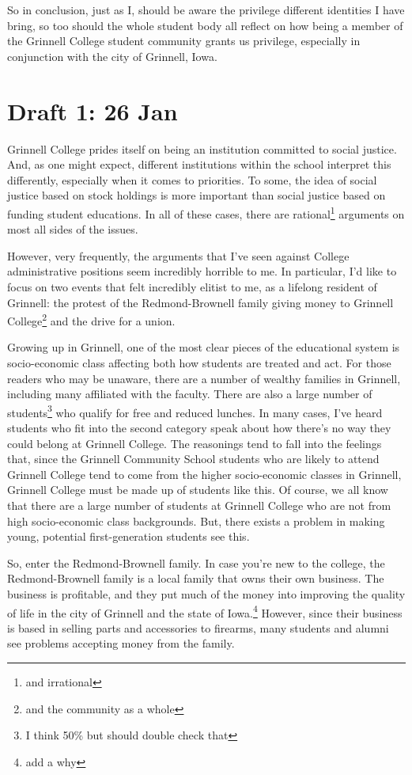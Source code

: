 \documentclass[12pt]{article}[titlepage]
\newcommand{\1}{\={a}}
\newcommand{\2}{\={e}}
\newcommand{\3}{\={\i}}
\newcommand{\4}{\=o}
\newcommand{\5}{\=u}
\newcommand{\6}{\={A}}
\renewcommand{\,}{\textsuperscript{,}}
\begin{document}
So in conclusion, just as I, should be aware the privilege different identities I have bring, so too should the whole student body all reflect on how being a member of the Grinnell College student community grants us privilege, especially in conjunction with the city of Grinnell, Iowa.
\section{Draft 1: 26 Jan}
Grinnell College prides itself on being an institution committed to social justice.
And, as one might expect, different institutions within the school interpret this differently, especially when it comes to priorities.
To some, the idea of social justice based on stock holdings is more important than social justice based on funding student educations.
In all of these cases, there are rational\footnote{and irrational} arguments on most all sides of the issues.

However, very frequently, the arguments that I've seen against College administrative positions seem incredibly horrible to me.
In particular, I'd like to focus on two events that felt incredibly elitist to me, as a lifelong resident of Grinnell: the protest of the Redmond-Brownell family giving money to Grinnell College\footnote{and the community as a whole} and the drive for a union.

Growing up in Grinnell, one of the most clear pieces of the educational system is socio-economic class affecting both how students are treated and act.
For those readers who may be unaware, there are a number of wealthy families in Grinnell, including many affiliated with the faculty.
There are also a large number of students\footnote{I think 50\% but should double check that} who qualify for free and reduced lunches.
In many cases, I've heard students who fit into the second category speak about how there's no way they could belong at Grinnell College.
The reasonings tend to fall into the feelings that, since the Grinnell Community School students who are likely to attend Grinnell College tend to come from the higher socio-economic classes in Grinnell, Grinnell College must be made up of students like this.
Of course, we all know that there are a large number of students at Grinnell College who are not from high socio-economic class backgrounds.
But, there exists a problem in making young, potential first-generation students see this.

So, enter the Redmond-Brownell family.
In case you're new to the college, the Redmond-Brownell family is a local family that owns their own business.
The business is profitable, and they put much of the money into improving the quality of life in the city of Grinnell and the state of Iowa.\footnote{add a why}
However, since their business is based in selling parts and accessories to firearms, many students and alumni see problems accepting money from the family.
\end{document}
